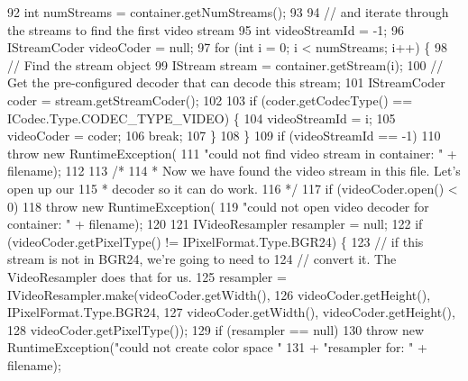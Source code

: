 \begin{DoxyCode}
92         \textcolor{keywordtype}{int} numStreams = container.getNumStreams();
93 
94         \textcolor{comment}{// and iterate through the streams to find the first video stream}
95         \textcolor{keywordtype}{int} videoStreamId = -1;
96         IStreamCoder videoCoder = null;
97         \textcolor{keywordflow}{for} (\textcolor{keywordtype}{int} i = 0; i < numStreams; i++) \{
98             \textcolor{comment}{// Find the stream object}
99             IStream stream = container.getStream(i);
100             \textcolor{comment}{// Get the pre-configured decoder that can decode this stream;}
101             IStreamCoder coder = stream.getStreamCoder();
102 
103             \textcolor{keywordflow}{if} (coder.getCodecType() == ICodec.Type.CODEC\_TYPE\_VIDEO) \{
104                 videoStreamId = i;
105                 videoCoder = coder;
106                 \textcolor{keywordflow}{break};
107             \}
108         \}
109         \textcolor{keywordflow}{if} (videoStreamId == -1)
110             \textcolor{keywordflow}{throw} \textcolor{keyword}{new} RuntimeException(
111                     \textcolor{stringliteral}{"could not find video stream in container: "} + filename);
112 
113         \textcolor{comment}{/*}
114 \textcolor{comment}{         * Now we have found the video stream in this file. Let's open up our
}
115 \textcolor{comment}{         * decoder so it can do work.
}
116 \textcolor{comment}{         */}
117         \textcolor{keywordflow}{if} (videoCoder.open() < 0)
118             \textcolor{keywordflow}{throw} \textcolor{keyword}{new} RuntimeException(
119                     \textcolor{stringliteral}{"could not open video decoder for container: "} + filename);
120 
121         IVideoResampler resampler = null;
122         \textcolor{keywordflow}{if} (videoCoder.getPixelType() != IPixelFormat.Type.BGR24) \{
123             \textcolor{comment}{// if this stream is not in BGR24, we're going to need to}
124             \textcolor{comment}{// convert it. The VideoResampler does that for us.}
125             resampler = IVideoResampler.make(videoCoder.getWidth(),
126                     videoCoder.getHeight(), IPixelFormat.Type.BGR24,
127                     videoCoder.getWidth(), videoCoder.getHeight(),
128                     videoCoder.getPixelType());
129             \textcolor{keywordflow}{if} (resampler == null)
130                 \textcolor{keywordflow}{throw} \textcolor{keyword}{new} RuntimeException(\textcolor{stringliteral}{"could not create color space "}
131                         + \textcolor{stringliteral}{"resampler for: "} + filename);

\end{DoxyCode}
